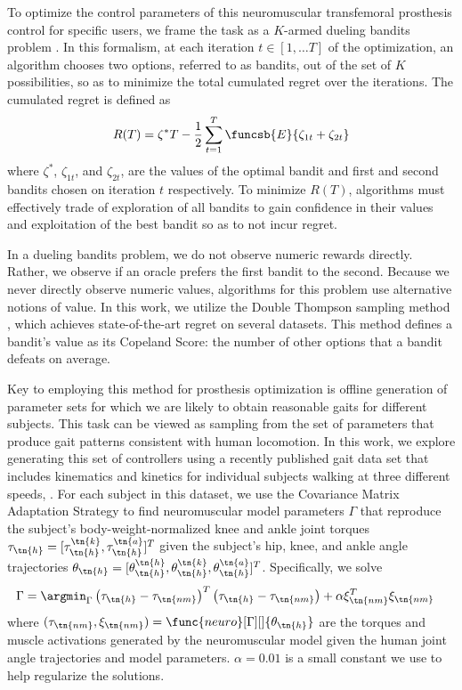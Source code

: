 To optimize the control parameters of this neuromuscular transfemoral prosthesis
control for specific users, we frame the task as a $K$-armed dueling bandits
problem \citep{yue2012k}. In this formalism, at each iteration $t \in [1,\ldots
T]$ of the optimization, an algorithm chooses two options, referred to as
bandits, out of the set of $K$ possibilities, so as to minimize the total
cumulated regret over the iterations. The cumulated regret is defined as
\begin{align}
    R(T) = \zeta^* T - \frac{1}{2} \sum_{t=1}^T \funcsb{E}{\zeta_{1t} + \zeta_{2t}}
\end{align}
where $\zeta^*$, $\zeta_{1t}$, and $\zeta_{2t}$, are the values of the optimal
bandit and first and second bandits chosen on iteration $t$ respectively. To
minimize $R(T)$, algorithms must effectively trade of exploration of all bandits
to gain confidence in their values and exploitation of the best bandit so as to
not incur regret.

In a dueling bandits problem, we do not observe numeric rewards directly.
Rather, we observe if an oracle prefers the first bandit to the second.  Because
we never directly observe numeric values, algorithms for this problem use
alternative notions of value. In this work, we utilize the Double Thompson
sampling method \citep{wu2016double}, which achieves state-of-the-art regret on
several datasets. This method defines a bandit's value as its Copeland Score:
the number of other options that a bandit defeats on average.

Key to employing this method for prosthesis optimization is offline generation
of parameter sets for which we are likely to obtain reasonable gaits for
different subjects. This task can be viewed as sampling from the set of
parameters that produce gait patterns consistent with human locomotion. In this
work, we explore generating this set of controllers using a recently published
gait data set that includes kinematics and kinetics for individual subjects
walking at three different speeds, 
\citep{moore2015elaborate}.  For each subject in this dataset, we use the
Covariance Matrix Adaptation Strategy \citep{hansen2006cma} to find
neuromuscular model parameters $\Gamma$ that reproduce the subject's
body-weight-normalized knee and ankle joint torques $\tau_\tn{h} =
[\tau_\tn{h}^\tn{k},\tau_\tn{h}^\tn{a}]^T$ given the subject's hip, knee, and
ankle angle trajectories $\theta_\tn{h} =
[\theta_\tn{h}^\tn{h},\theta_\tn{h}^\tn{k},\theta_\tn{h}^\tn{a}]^T$.
Specifically, we solve
\begin{align}
    \Gamma &= \argmin_\Gamma \left(\tau_\tn{h} - \tau_\tn{nm} \right)^T
    \left(\tau_\tn{h} - \tau_\tn{nm} \right) + \alpha \xi_\tn{nm}^T \xi_\tn{nm}
\end{align}
where $(\tau_\tn{nm}, \xi_\tn{nm}) = \func{neuro}[\Gamma][]{\theta_\tn{h}}$ are
the torques and muscle activations generated by the neuromuscular model given
the human joint angle trajectories and model parameters. $\alpha = 0.01$ is a
small constant we use to help regularize the solutions.

